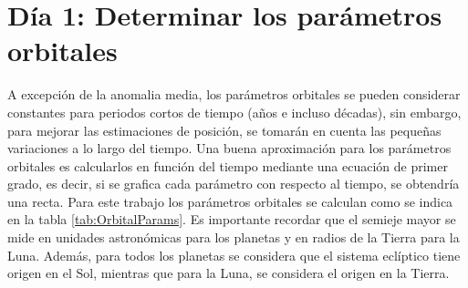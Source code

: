 \documentclass[a4paper,10pt]{article}
\begin{document}
\section{Día 1: Determinar los parámetros orbitales}
A excepción de la anomalia media, los parámetros orbitales se pueden considerar constantes para periodos cortos de tiempo (años e incluso décadas), sin embargo, para mejorar las estimaciones de posición, se tomarán en cuenta las pequeñas variaciones a lo largo del tiempo. Una buena aproximación para los parámetros orbitales es calcularlos en función del tiempo mediante una ecuación de primer grado, es decir, si se grafica cada parámetro con respecto al tiempo, se obtendría una recta. Para este trabajo los parámetros orbitales se calculan como se indica en la tabla \ref{tab:OrbitalParams}. Es importante recordar que el semieje mayor se mide en unidades astronómicas para los planetas y en radios de la Tierra para la Luna. Además, para todos los planetas se considera que el sistema eclíptico tiene origen en el Sol, mientras que para la Luna, se considera el origen en la Tierra. 
\end{document}
